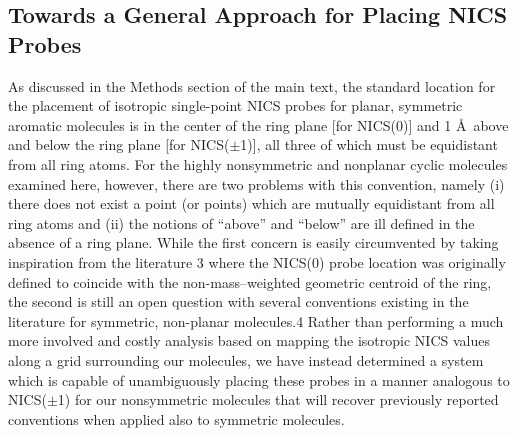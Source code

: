 \documentclass[aip,jcp,preprint,superscriptaddress,floatfix]{revtex4-1}
\begin{document}
\subsection{Towards a General Approach for Placing NICS
Probes\label{subsec:nics-probes}}

As discussed in the Methods section of the main text, the standard location for
the placement of isotropic single-point NICS probes for planar, symmetric
aromatic molecules is in the center of the ring plane [for NICS(0)] and 1 \AA\
above and below the ring plane [for NICS($\pm$1)], all three of which must be
equidistant from all ring atoms. For the highly nonsymmetric and nonplanar
cyclic molecules examined here, however, there are two problems with this
convention, namely (i) there does not exist a point (or points) which are
mutually equidistant from all ring atoms and (ii) the notions of ``above'' and
``below'' are ill defined in the absence of a ring plane. While the first
concern is easily circumvented by taking inspiration from the literature 3
where the NICS(0) probe location was originally defined to coincide with the
non-mass--weighted geometric centroid of the ring, the second is still an open
question with several conventions existing in the literature for symmetric,
non-planar molecules.4  Rather than performing a much more involved and costly
analysis based on mapping the isotropic NICS values along a grid surrounding
our molecules, we have instead determined a system which is capable of
unambiguously placing these probes in a manner analogous to NICS($\pm$1) for
our nonsymmetric molecules that will recover previously reported conventions
when applied also to symmetric molecules.
\end{document}
